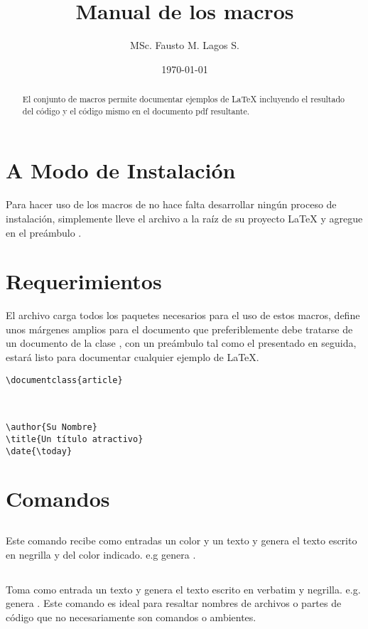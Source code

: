 \documentclass{article}
\author{MSc. Fausto M. Lagos S.}
\title{Manual de los macros \bftt{LaTeX2Code.tex}}
\date{\today}
\begin{document}
\maketitle

\begin{abstract}
	El conjunto de macros  permite documentar ejemplos de \LaTeX{} incluyendo el resultado del código y el código mismo en el documento pdf resultante. 
\end{abstract}
	
	\section{A Modo de Instalación}
		Para hacer uso de los macros de  no hace falta desarrollar ningún proceso de instalación, simplemente lleve el archivo  a la raíz de su proyecto \LaTeX{} y agregue en el preámbulo \texttt{}.
		
	\section{Requerimientos}
		El archivo  carga todos los paquetes necesarios para el uso de estos macros, define unos márgenes amplios para el documento que preferiblemente debe tratarse de un documento de la clase , con un preámbulo tal como el presentado en seguida, estará listo para documentar cualquier ejemplo de \LaTeX{}.
		\begin{verbatim}
\documentclass{article}



\author{Su Nombre}
\title{Un título atractivo}
\date{\today}
		\end{verbatim}
		
	\section{Comandos}
	
	\subsection{}
		Este comando recibe como entradas un color y un texto y genera el texto escrito en negrilla y del color indicado. e.g \texttt{} genera .
		
	\subsection{}
		Toma como entrada un texto y genera el texto escrito en verbatim y negrilla. e.g. \texttt{} genera . Este comando es ideal para resaltar nombres de archivos o partes de código que no necesariamente son comandos o ambientes.
\end{document}
